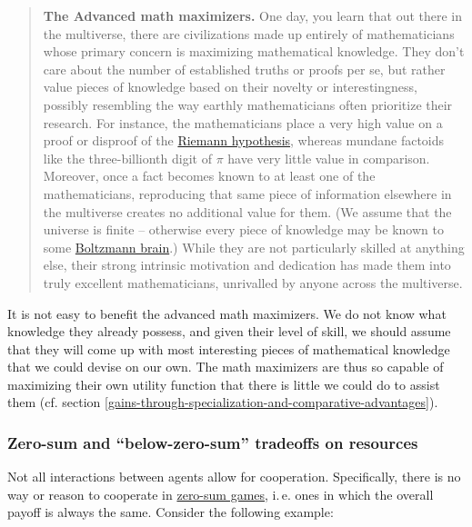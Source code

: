 \begin{quote}
\textbf{The Advanced math maximizers.} One day, you learn that out there
in the multiverse, there are civilizations made up entirely of
mathematicians whose primary concern is maximizing mathematical
knowledge. They don't care about the number of established truths or
proofs per se, but rather value pieces of knowledge based on their
novelty or interestingness, possibly resembling the way earthly
mathematicians often prioritize their research. For instance, the
mathematicians place a very high value on a proof or disproof of the
\href{https://en.wikipedia.org/wiki/Riemann_hypothesis}{Riemann
hypothesis}, whereas mundane factoids like the three-billionth digit of
\(\pi\) have very little value in comparison. Moreover, once a fact
becomes known to at least one of the mathematicians, reproducing that
same piece of information elsewhere in the multiverse creates no
additional value for them. (We assume that the universe is finite --
otherwise every piece of knowledge may be known to some
\href{https://en.wikipedia.org/wiki/Boltzmann_brain}{Boltzmann
brain}.) While they are not particularly skilled at anything else,
their strong intrinsic motivation and dedication has made them into
truly excellent mathematicians, unrivalled by anyone across the
multiverse.
\end{quote}

It is not easy to benefit the advanced math maximizers. We do not know
what knowledge they already possess, and given their level of skill, we
should assume that they will come up with most interesting pieces of
mathematical knowledge that we could devise on our own. The math
maximizers are thus so capable of maximizing their own utility function
that there is little we could do to assist them (cf. section
\ref{gains-through-specialization-and-comparative-advantages}).

\hypertarget{zero-sum-and-below-zero-sum-tradeoffs-on-resources}{\subsubsection{Zero-sum
and ``below-zero-sum'' tradeoffs on
resources}\label{zero-sum-and-below-zero-sum-tradeoffs-on-resources}}

Not all interactions between agents allow for cooperation. Specifically,
there is no way or reason to cooperate in
\href{https://en.wikipedia.org/wiki/Zero-sum_game}{zero-sum games},
i.\,e. ones in which the overall payoff is always the same. Consider the
following example:

